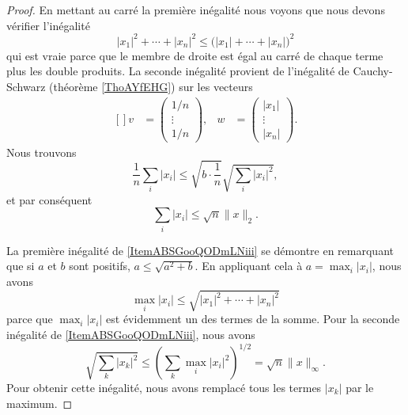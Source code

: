 \begin{proof}
    En mettant au carré la première inégalité nous voyons que nous devons vérifier l'inégalité
    \begin{equation}
        | x_1 |^2+\cdots+| x_n |^2\leq\big( | x_1 |+\cdots+| x_n | \big)^2
    \end{equation}
    qui est vraie parce que le membre de droite est égal au carré de chaque terme plus les double produits. La seconde inégalité provient de l'inégalité de Cauchy-Schwarz (théorème \ref{ThoAYfEHG}) sur les vecteurs
    \begin{equation}
        \begin{aligned}[]
            v&=\begin{pmatrix}
                1/n    \\ 
                \vdots    \\ 
                1/n    
            \end{pmatrix},
            &w&=\begin{pmatrix}
                | x_1 |    \\ 
                \vdots    \\ 
                | x_n |    
            \end{pmatrix}.
        \end{aligned}
    \end{equation}
    Nous trouvons 
    \begin{equation}
        \frac{1}{ n }\sum_i| x_i |\leq\sqrt{b\cdot\frac{1}{ n }}\sqrt{\sum_i| x_i |^2},
    \end{equation}
    et par conséquent
    \begin{equation}
        \sum_i| x_i |\leq\sqrt{n}\| x \|_2.
    \end{equation}
    
    La première inégalité de \ref{ItemABSGooQODmLNiii} se démontre en remarquant que si \( a\) et \( b\) sont positifs, \( a\leq\sqrt{a^2+b}\). En appliquant cela à \( a=\max_i| x_i |\), nous avons
    \begin{equation}
        \max_i| x_i |\leq\sqrt{ | x_1 |^2+\cdots+| x_n |^2  }
    \end{equation}
    parce que \( \max_i| x_i |\) est évidemment un des termes de la somme. Pour la seconde inégalité de \ref{ItemABSGooQODmLNiii}, nous avons
    \begin{equation}
        \sqrt{\sum_k| x_k |^2}\leq\left( \sum_k\max_i| x_i |^2 \right)^{1/2}=\sqrt{n}\| x \|_{\infty}.
    \end{equation}
    Pour obtenir cette inégalité, nous avons remplacé tous les termes \( | x_k |\) par le maximum.
\end{proof}


